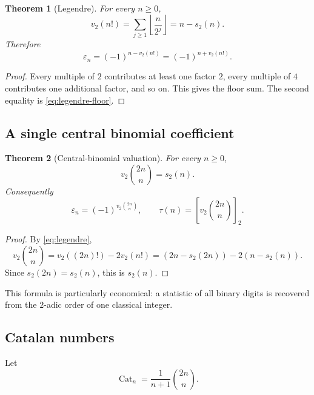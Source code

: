 \documentclass[11pt,oneside]{article}
\newtheorem{theorem}{Theorem}[section]
\theoremstyle{definition}
\theoremstyle{remark}
\newcommand{\vtwo}{v_2}
\newcommand{\bitsum}{s_2}
\newcommand{\eps}{\varepsilon}
\newcommand{\floor}[1]{\left\lfloor #1\right\rfloor}
\newcommand{\res}[2]{\left[#1\right]_{#2}}
\newcommand{\Cat}{\operatorname{Cat}}
\begin{document}
\begin{theorem}[Legendre]\label{thm:legendre}
For every $n\ge0$,
\begin{equation}\label{eq:legendre}
 \vtwo(n!)=\sum_{j\ge1}\floor{\frac n{2^j}}=n-\bitsum(n).
\end{equation}
Therefore
\begin{equation}\label{eq:factorial-sign}
 \eps_n=(-1)^{n-\vtwo(n!)}=(-1)^{n+\vtwo(n!)}.
\end{equation}
\end{theorem}

\begin{proof}
Every multiple of $2$ contributes at least one factor $2$, every multiple of
$4$ contributes one additional factor, and so on.  This gives the floor sum.
The second equality is \cref{eq:legendre-floor}.
\end{proof}

\subsection{A single central binomial coefficient}

\begin{theorem}[Central-binomial valuation]\label{thm:central-binomial}
For every $n\ge0$,
\begin{equation}\label{eq:central-binomial-v2}
 \vtwo\binom{2n}{n}=\bitsum(n).
\end{equation}
Consequently
\begin{equation}\label{eq:central-binomial-thue-morse}
 \boxed{\ \eps_n=(-1)^{\vtwo\binom{2n}{n}},\qquad
 \tau(n)=\res{\vtwo\binom{2n}{n}}{2}.\ }
\end{equation}
\end{theorem}

\begin{proof}
By \cref{eq:legendre},
\[
 \vtwo\binom{2n}{n}
 =\vtwo((2n)!)-2\vtwo(n!)
 =(2n-\bitsum(2n))-2(n-\bitsum(n)).
\]
Since $\bitsum(2n)=\bitsum(n)$, this is $\bitsum(n)$.
\end{proof}

This formula is particularly economical: a statistic of all binary digits is
recovered from the $2$-adic order of one classical integer.

\subsection{Catalan numbers}

Let
\[
 \Cat_n=\frac1{n+1}\binom{2n}{n}.
\]
\end{document}
